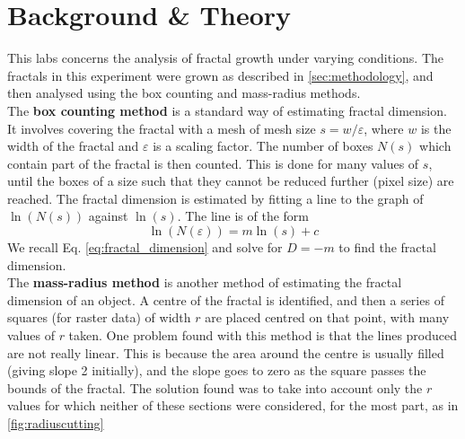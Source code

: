 \documentclass{article}
\theoremstyle{definition}
\theoremstyle{remark}
\begin{document}
\section{Background \& Theory}\label{sec:background}
This labs concerns the analysis of fractal growth under varying conditions. The fractals in this experiment were grown as described in \ref{sec:methodology}, and then analysed using the box counting and mass-radius methods.\\
\indent The \textbf{box counting method} is a standard way of estimating fractal dimension. It involves covering the fractal with a mesh of mesh size $s = w/\varepsilon$, where $w$ is the width of the fractal and $\varepsilon$ is a scaling factor. The number of boxes $N(s)$ which contain part of the fractal is then counted. This is done for many values of $s$, until the boxes of a size such that they cannot be reduced further (pixel size) are reached. The fractal dimension is estimated by fitting a line to the graph of $\ln(N(s))$ against $\ln(s)$. The line is of the form
\begin{equation}
        \ln(N(\varepsilon)) = m\ln(s) + c
\end{equation}
We recall Eq. \ref{eq:fractal_dimension} and solve for $D=-m$ to find the fractal dimension.\\
\indent The \textbf{mass-radius method} is another method of estimating the fractal dimension of an object. A centre of the fractal is identified, and then a series of squares (for raster data) of width $r$ are placed centred on that point, with many values of $r$ taken. One problem found with this method is that the lines produced are not really linear. This is because the area around the centre is usually filled (giving slope 2 initially), and the slope goes to zero as the square passes the bounds of the fractal. The solution found was to take into account only the $r$ values for which neither of these sections were considered, for the most part, as in \ref{fig:radiuscutting}\\
\end{document}
